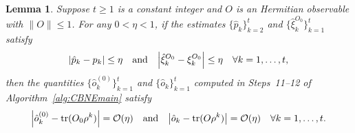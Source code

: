 \documentclass[aps,prl,twocolumn,nofootinbib,superscriptaddress,10pt]{revtex4-2}
\let\originalleft\left
\let\originalright\right
\renewcommand{\left}{\mathopen{}\mathclose\bgroup\originalleft}
\renewcommand{\right}{\aftergroup\egroup\originalright}
\DeclareMathOperator{\Tr}{tr}
\theoremstyle{plain}
\newtheorem{lemma}{Lemma}
\theoremstyle{definition}
\begin{document}
\begin{lemma}\label{lem:MoOlessTrans}
Suppose $t\geq1$ is a constant integer and $O$ is an Hermitian observable with $\|O\|\leq1$. 
For any $0<\eta<1$, if the estimates $\{\hat{p}_k\}_{k=2}^t$ and $\{\hat{\xi}_k^{O_0}\}_{k=1}^t$ satisfy
\begin{align}\label{eq:Cond1ptOTrans}
|\hat{p}_k - p_k| \leq \eta 
\quad \text{and} \quad 
\left| \hat{\xi}_k^{O_0} - \xi_k^{O_0}\right|  \leq \eta 
\quad \forall k = 1, \dots, t, 
\end{align} 
then the quantities $\{\hat{o}_k^{(0)}\}_{k=1}^t$ and $\{\hat{o}_k\}_{k=1}^t$ computed in Steps~11--12 of Algorithm~\ref{alg:CBNEmain} satisfy
\begin{align}
\left| \hat{o}_k^{(0)}-\Tr(O_0\rho^k)\right|  = \mathcal{O}(\eta)
\quad \text{and} \quad 
\left|\hat{o}_k-\Tr(O\rho^k)\right|  = \mathcal{O}(\eta)  
 \quad \forall k = 1, \dots, t. 
\end{align} 
\end{lemma}
\end{document}
